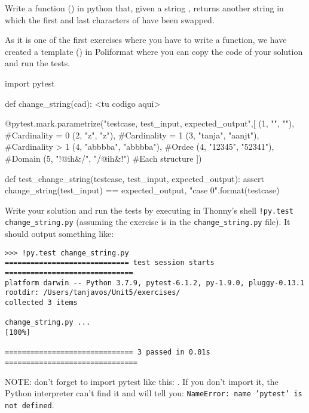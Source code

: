 \begin{exercise}
Write a function () in python that, given a string , returns another string in which the first and last characters of  have been swapped.

As it is one of the first exercises where you have to write a function, we have created a template () in Poliformat where you can copy the code of your solution and run the tests.

\begin{small}
\begin{python}
import pytest

def change_string(cad):
      <tu codigo aqui>
	  
@pytest.mark.parametrize("testcase, test_input, expected_output",[
(1, "", ""),               #Cardinality = 0
(2, "z", "z"),             #Cardinality = 1
(3, "tanja", "aanjt"),     #Cardinality > 1
(4, "abbbba", "abbbba"),   #Ordee
(4, "12345", "52341"),     #Domain
(5, "!@ih&/", "/@ih&!")    #Each structure
])

def test_change_string(testcase, test_input, expected_output):
    assert change_string(test_input) == expected_output, "case {0}".format(testcase)
\end{python}
\end{small}

Write your solution and run the tests by executing in Thonny's shell \texttt{!py.test change\_string.py} (assuming the exercise is in the \texttt{change\_string.py} file).
It should output something like:

\begin{verbatim}
>>> !py.test change_string.py
============================= test session starts ==============================
platform darwin -- Python 3.7.9, pytest-6.1.2, py-1.9.0, pluggy-0.13.1
rootdir: /Users/tanjavos/Unit5/exercises/
collected 3 items

change_string.py ...                                                     [100%]

============================== 3 passed in 0.01s ===============================
\end{verbatim}

NOTE: don't forget to import pytest like this:
. If you don't import it, the Python interpreter can't find it and will tell you: \texttt{NameError: name 'pytest' is not defined}.


\end{exercise}


